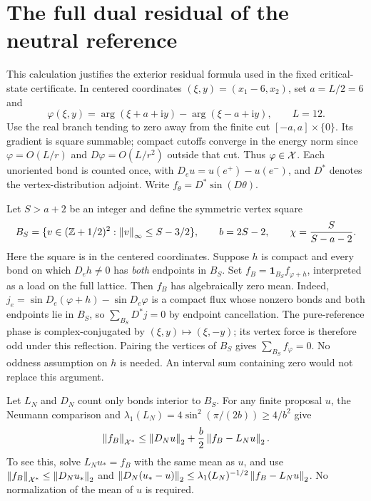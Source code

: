 \section{The full dual residual of the neutral reference}
\label{app:reflected-residual}

This calculation justifies the exterior residual formula used in the
fixed critical-state certificate. In centered coordinates
$(\xi,y)=(x_1-6,x_2)$, set $a=L/2=6$ and
\[
 \varphi(\xi,y)=\arg(\xi+a+\mathrm i y)
                  -\arg(\xi-a+\mathrm i y),\qquad L=12.
\]
Use the real branch tending to zero away from the finite cut
$[-a,a]\times\{0\}$. Its gradient is square summable; compact cutoffs
converge in the energy norm since $\varphi=O(L/r)$ and
$D\varphi=O(L/r^2)$ outside that cut. Thus $\varphi\in\mathcal X$.
Each unoriented bond is counted once, with
$D_eu=u(e^+)-u(e^-)$, and $D^*$ denotes the vertex-distribution adjoint.
Write $f_\theta=D^*\sin(D\theta)$.

Let $S>a+2$ be an integer and define the symmetric vertex square
\[
 B_S=\{v\in(\mathbb Z+1/2)^2:\left\lVert v\right\rVert_\infty\le S-3/2\},
 \qquad b=2S-2,\qquad \chi=\frac{S}{S-a-2}.
\]
Here the square is in the centered coordinates. Suppose $h$ is compact
and every bond on which $D_eh\ne0$ has \emph{both} endpoints in $B_S$.
Set $f_B=\mathbf1_{B_S}f_{\varphi+h}$, interpreted as a load on the
full lattice. Then $f_B$ has algebraically zero mean. Indeed,
$j_e=\sin D_e(\varphi+h)-\sin D_e\varphi$ is a compact flux whose
nonzero bonds and both endpoints lie in $B_S$, so
$\sum_{B_S}D^*j=0$ by endpoint cancellation. The pure-reference phase is
complex-conjugated by $(\xi,y)\mapsto(\xi,-y)$; its vertex force is
therefore odd under this reflection. Pairing the vertices of $B_S$
gives $\sum_{B_S}f_\varphi=0$. No oddness assumption on $h$ is needed.
An interval sum containing zero would not replace this argument.

Let $L_N$ and $D_N$ count only bonds interior to $B_S$. For any finite
proposal $u$, the Neumann comparison and
$\lambda_1(L_N)=4\sin^2(\pi/(2b))\ge4/b^2$ give
\begin{equation}
 \left\lVert f_B\right\rVert_{\mathcal X^*}
 \le \left\lVert D_Nu\right\rVert_2+\frac b2\left\lVert f_B-L_Nu\right\rVert_2.
 \label{eq:finite-residual-energy}
\end{equation}
To see this, solve $L_Nu_*=f_B$ with the same mean as $u$, and use
$\left\lVert f_B\right\rVert_{\mathcal X^*}\le\left\lVert D_Nu_*\right\rVert_2$ and
$\left\lVert D_N(u_*-u)\right\rVert_2\le\lambda_1(L_N)^{-1/2}
\left\lVert f_B-L_Nu\right\rVert_2$. No normalization of the mean of $u$ is required.

